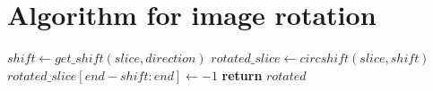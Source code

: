 \documentclass[reprint,amsmath,amssymb,aps,pre,showkeys,showpacs,nofootinbib]{revtex4-1}
\begin{document}
\section{Algorithm for image rotation}
\label{rotating}

\begin{algorithmic}[1]
      \State $shift \gets get\_shift(slice, direction)$
      \State $rotated\_slice \gets circshift(slice, shift)$
        \State $rotated\_slice[end - shift:end] \gets -1$
      \EndIf
    \EndFor
  \State \textbf{return} $rotated$
  \EndProcedure
\end{algorithmic}


\end{document}
